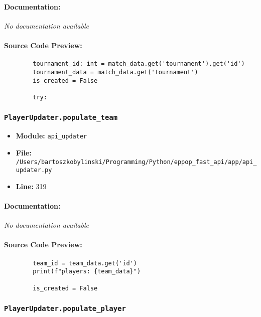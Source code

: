 \documentclass[11pt,a4paper]{article}
\begin{document}
\paragraph{Documentation:} \textit{No documentation available}

\paragraph{Source Code Preview:}
\begin{verbatim}
        tournament_id: int = match_data.get('tournament').get('id')
        tournament_data = match_data.get('tournament')
        is_created = False

        try:
\end{verbatim}

\vspace{1em}
\subsubsection{\texttt{PlayerUpdater.populate\_team}}

\begin{itemize}
    \item \textbf{Module:} \texttt{api\_updater}
    \item \textbf{File:} \texttt{/Users/bartoszkobylinski/Programming/Python/eppop\_fast\_api/app/api\_updater.py}
    \item \textbf{Line:} 319
\end{itemize}

\paragraph{Documentation:} \textit{No documentation available}

\paragraph{Source Code Preview:}
\begin{verbatim}
        team_id = team_data.get('id')
        print(f"players: {team_data}")

        is_created = False

\end{verbatim}

\vspace{1em}
\subsubsection{\texttt{PlayerUpdater.populate\_player}}
\end{document}
